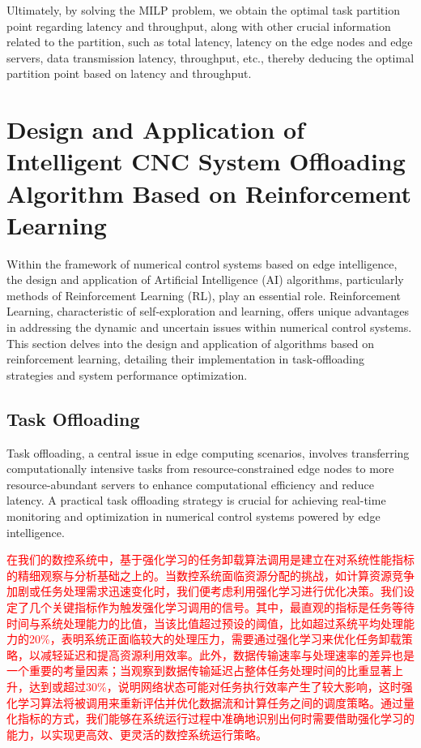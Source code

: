 \documentclass[preprint,12pt]{elsarticle}
\begin{document}
Ultimately, by solving the MILP problem, we obtain the optimal task partition point regarding latency and throughput, along with other crucial information related to the partition, such as total latency, latency on the edge nodes and edge servers, data transmission latency, throughput, etc., thereby deducing the optimal partition point based on latency and throughput.

\section{Design and Application of Intelligent CNC System Offloading Algorithm Based on Reinforcement Learning }

Within the framework of numerical control systems based on edge intelligence, the design and application of Artificial Intelligence (AI) algorithms, particularly methods of Reinforcement Learning (RL), play an essential role. Reinforcement Learning, characteristic of self-exploration and learning, offers unique advantages in addressing the dynamic and uncertain issues within numerical control systems. This section delves into the design and application of algorithms based on reinforcement learning, detailing their implementation in task-offloading strategies and system performance optimization.

\subsection{Task Offloading}

Task offloading, a central issue in edge computing scenarios, involves transferring computationally intensive tasks from resource-constrained edge nodes to more resource-abundant servers to enhance computational efficiency and reduce latency. A practical task offloading strategy is crucial for achieving real-time monitoring and optimization in numerical control systems powered by edge intelligence.

\textcolor{red}{在我们的数控系统中，基于强化学习的任务卸载算法调用是建立在对系统性能指标的精细观察与分析基础之上的。当数控系统面临资源分配的挑战，如计算资源竞争加剧或任务处理需求迅速变化时，我们便考虑利用强化学习进行优化决策。我们设定了几个关键指标作为触发强化学习调用的信号。其中，最直观的指标是任务等待时间与系统处理能力的比值，当该比值超过预设的阈值，比如超过系统平均处理能力的20\%，表明系统正面临较大的处理压力，需要通过强化学习来优化任务卸载策略，以减轻延迟和提高资源利用效率。此外，数据传输速率与处理速率的差异也是一个重要的考量因素；当观察到数据传输延迟占整体任务处理时间的比重显著上升，达到或超过30\%，说明网络状态可能对任务执行效率产生了较大影响，这时强化学习算法将被调用来重新评估并优化数据流和计算任务之间的调度策略。通过量化指标的方式，我们能够在系统运行过程中准确地识别出何时需要借助强化学习的能力，以实现更高效、更灵活的数控系统运行策略。}
\end{document}
